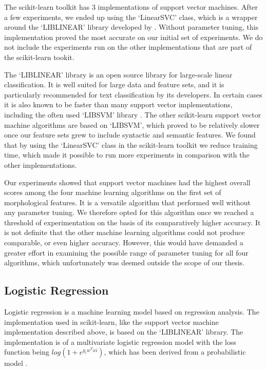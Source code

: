 The scikit-learn toolkit has 3 implementations of support vector machines. After a few experiments, we ended up using the `LinearSVC' class, which is a wrapper around the `LIBLINEAR' library developed by . Without parameter tuning, this implementation proved the most accurate on our initial set of experiments. We do not include the experiments run on the other implementations that are part of the scikit-learn tookit.

The `LIBLINEAR' library is an open source library for large-scale linear classification. It is well suited for large data and feature sets, and it is particularly recommended for text classification by its developers. In certain cases it is also known to be faster than many support vector implementations, including the often used `LIBSVM' library \cite{liblinear}. The other scikit-learn support vector machine algorithms are based on `LIBSVM', which proved to be relatively slower once our feature sets grew to include syntactic and semantic features. We found that by using the `LinearSVC' class in the scikit-learn toolkit we reduce training time, which made it possible to run more experiments in comparison with the other implementations. 

Our experiments showed that support vector machines had the highest overall scores among the four machine learning algorithms on the first set of morphological features. It is a versatile algorithm that performed well without any parameter tuning. We therefore opted for this algorithm once we reached a threshold of experimentation on the basis of its comparatively higher accuracy. It is not definite that the other machine learning algorithms could not produce comparable, or even higher accuracy. However, this would have demanded a greater effort in examining the possible range of parameter tuning for all four algorithms, which unfortunately was deemed outside the scope of our thesis.

\subsection{Logistic Regression}

Logistic regression is a machine learning model based on regression analysis. The implementation used in scikit-learn, like the support vector machine implementation described above, is based on the `LIBLINEAR' library. The implementation is of a multivariate logistic regression model with the loss function being $log(1+e^{y_iw^Txi})$, which has been derived from a probabilistic model \cite{liblinear}.

